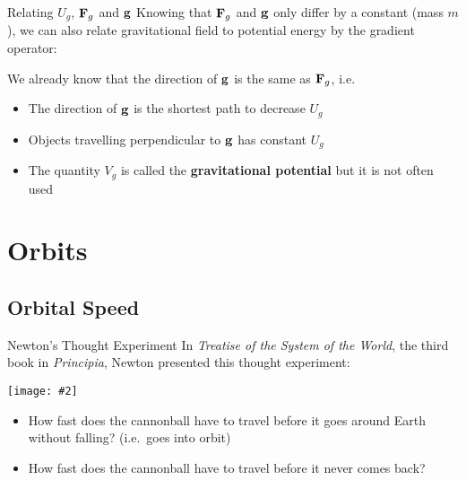 \documentclass[12pt,compress,aspectratio=169]{beamer}
\newcommand{\pic}[2]{\texttt{[image: \#2]}}
\newcommand{\mb}[1]{\ensuremath\mathbf{#1}}
\newcommand{\eq}[2]{\vspace{#1}{\Large\begin{displaymath}#2\end{displaymath}}}
\begin{document}
\begin{frame}{Relating $U_g$, $\mb{F}_g$ and $\mb{g}$}
  Knowing that $\mb{F}_g$ and $\mb{g}$ only differ by a constant (mass $m$), we
  can also relate gravitational field to potential energy by the gradient
  operator:

  \eq{-.15in}{
    \mb{g}%
    =-\nabla V_g=-\frac{\partial V_g}{\partial r}\hat{\mb{r}}
    \quad\text{where}\quad
    V_g=\frac{U_g}{m}
  }

  We already know that the direction of $\mb{g}$ is the same as $\mb{F}_g$,
  i.e.
  \begin{itemize}
  \item The direction of $\mb{g}$ is the shortest path to decrease $U_g$ 
  \item Objects travelling perpendicular to $\mb{g}$ has constant $U_g$
  \item The quantity $V_g$ is called the \textbf{gravitational potential} but
    it is not often used
  \end{itemize}
\end{frame}



\section{Orbits}

\subsection{Orbital Speed}

\begin{frame}{Newton's Thought Experiment}
  In \emph{Treatise of the System of the World}, the third book in
  \emph{Principia}, Newton presented this thought experiment:
  \begin{center}
    \pic{.8}{figure-5.png}
  \end{center}
  \begin{itemize}
  \item How fast does the cannonball have to travel before it goes around Earth
    without falling? (i.e.\ goes into orbit)
  \item How fast does the cannonball have to travel before it never comes back?
  \end{itemize}
\end{frame}
\end{document}

